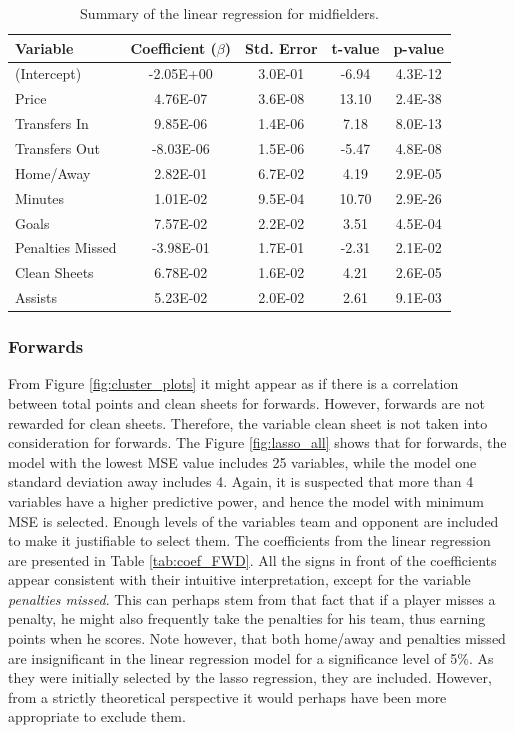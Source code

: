 \begin{table}[H]
\centering
\begin{tabular}{|l|c|c|c|c|}
\hline
Variable         & Coefficient ($\beta$)  & Std. Error &  t-value & p-value \\ \hline
(Intercept)      & -2.05E+00 & 3.0E-01    & -6.94   & 4.3E-12 \\
Price            & 4.76E-07  & 3.6E-08    & 13.10   & 2.4E-38 \\
Transfers In     & 9.85E-06  & 1.4E-06    & 7.18    & 8.0E-13 \\
Transfers Out    & -8.03E-06 & 1.5E-06    & -5.47   & 4.8E-08 \\
Home/Away        & 2.82E-01  & 6.7E-02    & 4.19    & 2.9E-05 \\
Minutes          & 1.01E-02  & 9.5E-04    & 10.70   & 2.9E-26 \\
Goals            & 7.57E-02  & 2.2E-02    & 3.51    & 4.5E-04 \\
Penalties Missed & -3.98E-01 & 1.7E-01    & -2.31   & 2.1E-02 \\
Clean Sheets     & 6.78E-02  & 1.6E-02    & 4.21    & 2.6E-05 \\
Assists          & 5.23E-02  & 2.0E-02    & 2.61    & 9.1E-03 \\
\hline
\end{tabular}
\caption{Summary of the linear regression for midfielders.}
\label{tab:coef_MID}
\end{table}


\subsubsection{Forwards}

From Figure \ref{fig:cluster_plots} it might appear as if there is a correlation between total points and clean sheets for forwards. However, forwards are not rewarded for clean sheets. Therefore, the variable clean sheet is not taken into consideration for forwards. The Figure \ref{fig:lasso_all} shows that for forwards, the model with the lowest MSE value includes 25 variables, while the model one standard deviation away includes 4. Again, it is suspected that more than 4 variables have a higher predictive power, and hence the model with minimum MSE is selected. Enough levels of the variables team and opponent are included to make it justifiable to select them. The coefficients from the linear regression are presented in Table \ref{tab:coef_FWD}. All the signs in front of the coefficients appear consistent with their intuitive interpretation, except for the variable \textit{penalties missed}. This can perhaps stem from that fact that if a player misses a penalty, he might also frequently take the penalties for his team, thus earning points when he scores. Note however, that both home/away and penalties missed are insignificant in the linear regression model for a significance level of 5\%. As they were initially selected by the lasso regression, they are included. However, from a strictly theoretical perspective it would perhaps have been more appropriate to exclude them.

